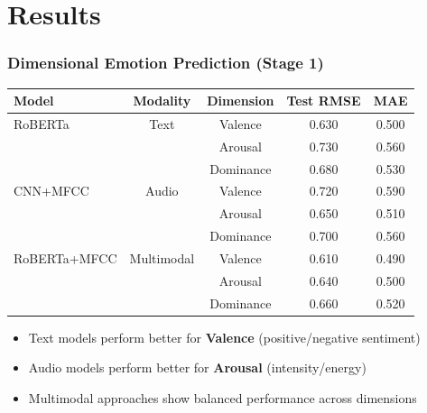 \documentclass{beamer}
\begin{document}
\section{Results}

\begin{frame}
\frametitle{Dimensional Emotion Prediction (Stage 1)}
\begin{center}
\begin{tabular}{|l|c|c|c|c|}
\hline
\textbf{Model} & \textbf{Modality} & \textbf{Dimension} & \textbf{Test RMSE} & \textbf{MAE} \\
\hline
RoBERTa & Text & Valence & 0.630 & 0.500 \\
         &      & Arousal & 0.730 & 0.560 \\
         &      & Dominance & 0.680 & 0.530 \\
\hline
CNN+MFCC & Audio & Valence & 0.720 & 0.590 \\
          &       & Arousal & 0.650 & 0.510 \\
          &       & Dominance & 0.700 & 0.560 \\
\hline
RoBERTa+MFCC & Multimodal & Valence & 0.610 & 0.490 \\
              &            & Arousal & 0.640 & 0.500 \\
              &            & Dominance & 0.660 & 0.520 \\
\hline
\end{tabular}
\end{center}

\begin{itemize}
    \item Text models perform better for \textbf{Valence} (positive/negative sentiment)
    \item Audio models perform better for \textbf{Arousal} (intensity/energy)
    \item Multimodal approaches show balanced performance across dimensions
\end{itemize}
\end{frame}
\end{document}
